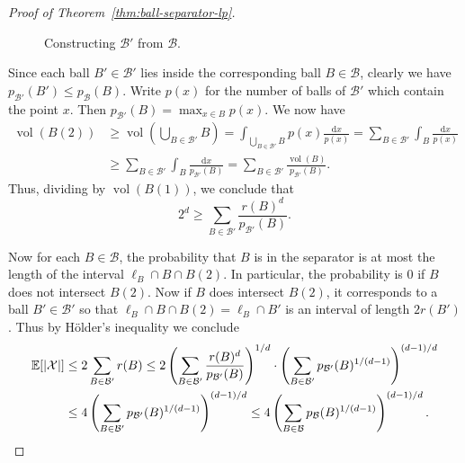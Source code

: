\documentclass[11pt, reqno]{amsart}
\theoremstyle{plain}
\theoremstyle{definition}
\theoremstyle{remark}
\numberwithin{theorem}{section}
\numberwithin{equation}{section}
\newcommand{\paren}[1]{\left( #1 \right)}
\newcommand{\E}{\mathbb E}
\newcommand{\fB}{\mathcal B}
\newcommand{\fX}{\mathcal X}
\DeclareMathOperator{\vol}{vol}
\begin{document}
\begin{proof}[Proof of Theorem~\ref{thm:ball-separator-lp}]
\begin{figure}
\caption{\label{fig:constructing-B'}
Constructing $\fB'$ from $\fB$.}
\end{figure}

Since each ball $B'\in\fB'$ lies inside the corresponding ball $B\in \fB$, clearly we have $p_{\fB'}(B')\leq p_{\fB}(B)$. Write $p(x)$ for the number of balls of $\fB'$ which contain the point $x$. Then $p_{\fB'}(B)=\max_{x\in B}p(x)$. We now have
\begin{align*}
\vol(B(2))
&\geq \vol\paren{\bigcup_{B\in\fB'}B}
=\int_{\bigcup_{B\in\fB'}B}p(x)\frac{\mathrm dx}{p(x)}
=\sum_{B\in\fB'}\int_B \frac{\mathrm dx}{p(x)}\\
&\geq\sum_{B\in\fB'}\int_B \frac{\mathrm dx}{p_{\fB'}(B)}
=\sum_{B\in\fB'}\frac{\vol(B)}{p_{\fB'}(B)}.
\end{align*}
Thus, dividing by $\vol(B(1))$, we conclude that
\[2^d\geq\sum_{B\in\fB'}\frac{r(B)^d}{p_{\fB'}(B)}.\]

Now for each $B\in\fB$, the probability that $B$ is in the separator is at most the length of the interval $\ell_B\cap B\cap B(2)$. In particular, the probability is 0 if $B$ does not intersect $B(2)$. Now if $B$ does intersect $B(2)$, it corresponds to a ball $B'\in\fB'$ so that $\ell_B\cap B\cap B(2)=\ell_B\cap B'$ is an interval of length $2r(B')$. Thus by H\"older's inequality we conclude
\begin{align*}
\E[|\fX|]
&\leq 2\sum_{B\in\fB'} r(B)
\leq 2 \paren{\sum_{B\in\fB'}\frac{r(B)^d}{p_{\fB'}(B)}}^{1/d}\cdot \paren{\sum_{B\in\fB'}p_{\fB'}(B)^{1/(d-1)}}^{(d-1)/d}\\
&\leq 4\paren{\sum_{B\in\fB'} p_{\fB'}(B)^{1/(d-1)}}^{(d-1)/d}
\leq 4\paren{\sum_{B\in\fB} p_{\fB}(B)^{1/(d-1)}}^{(d-1)/d}.\qedhere
\end{align*}
\end{proof}
\end{document}
